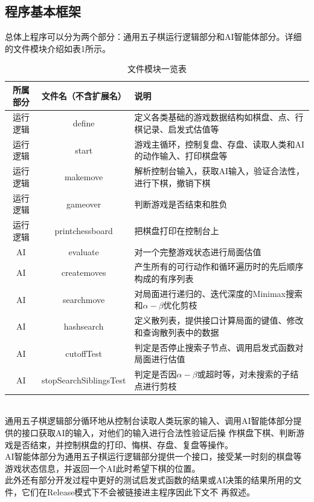 \documentclass{acm_proc_article-sp}
\begin{document}
\subsection{\textbf{程序基本框架}}
总体上程序可以分为两个部分：通用五子棋运行逻辑部分和AI智能体部分。详细的文件模块介绍如表1所示。\\
\begin{table}
       \centering
       \caption{文件模块一览表}
       \begin{tabular}{|c|c|l|} \hline
       所属部分 & 文件名（不含扩展名） & 说明\\ \hline
       运行逻辑 & define & 定义各类基础的游戏数据结构如棋盘、点、行棋记录、启发式估值等\\ \hline
       运行逻辑 & start & 游戏主循环，控制复盘、存盘、读取人类和AI的动作输入、打印棋盘等\\ \hline
       运行逻辑 & makemove & 解析控制台输入，获取AI输入，验证合法性，进行下棋，撤销下棋\\ \hline
       运行逻辑 & gameover & 判断游戏是否结束和胜负\\ \hline
       运行逻辑 & printchessboard & 把棋盘打印在控制台上\\ \hline
       AI & evaluate & 对一个完整游戏状态进行局面估值\\ \hline
       AI & createmoves & 产生所有的可行动作和循环遍历时的先后顺序构成的有序列表\\ \hline
       AI & searchmove & 对局面进行递归的、迭代深度的Minimax搜索和$\alpha-\beta$优化剪枝\\ \hline
       AI & hashsearch & 定义散列表，提供接口计算局面的键值、修改和查询散列表中的数据\\ \hline
       AI & cutoffTest & 判定是否停止搜索子节点、调用启发式函数对局面进行估值\\ \hline
       AI & stopSearchSiblingsTest & 判定是否因$\alpha-\beta$或超时等，对未搜索的子结点进行剪枝\\ \hline
       \end{tabular}
\end{table}\\
通用五子棋逻辑部分循环地从控制台读取人类玩家的输入、调用AI智能体部分提供的接口获取AI的输入，对他们的输入进行合法性验证后操
作棋盘下棋、判断游戏是否结束，并控制棋盘的打印、悔棋、存盘、复盘等操作。\\
AI智能体部分为通用五子棋运行逻辑部分提供一个接口，接受某一时刻的棋盘等游戏状态信息，并返回一个AI此时希望下棋的位置。\\
此外还有部分开发过程中更好的测试启发式函数的结果或AI决策的结果所用的文件，它们在Release模式下不会被链接进主程序因此下文不
再叙述。\\
\end{document}
